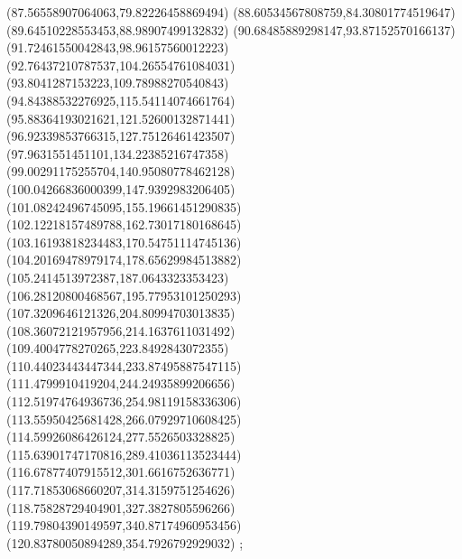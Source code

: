 {(87.56558907064063,79.82226458869494)
(88.60534567808759,84.30801774519647)
(89.64510228553453,88.98907499132832)
(90.68485889298147,93.87152570166137)
(91.72461550042843,98.96157560012223)
(92.76437210787537,104.26554761084031)
(93.8041287153223,109.78988270540843)
(94.84388532276925,115.54114074661764)
(95.88364193021621,121.52600132871441)
(96.92339853766315,127.75126461423507)
(97.9631551451101,134.22385216747358)
(99.00291175255704,140.95080778462128)
(100.04266836000399,147.9392983206405)
(101.08242496745095,155.19661451290835)
(102.12218157489788,162.73017180168645)
(103.16193818234483,170.54751114745136)
(104.20169478979174,178.65629984513882)
(105.2414513972387,187.0643323353423)
(106.28120800468567,195.77953101250293)
(107.3209646121326,204.80994703013835)
(108.36072121957956,214.1637611031492)
(109.4004778270265,223.8492843072355)
(110.44023443447344,233.87495887547115)
(111.4799910419204,244.24935899206656)
(112.51974764936736,254.98119158336306)
(113.55950425681428,266.07929710608425)
(114.59926086426124,277.5526503328825)
(115.63901747170816,289.41036113523444)
(116.67877407915512,301.6616752636771)
(117.71853068660207,314.3159751254626)
(118.75828729404901,327.3827805596266)
(119.79804390149597,340.87174960953456)
(120.83780050894289,354.7926792929032)
};
